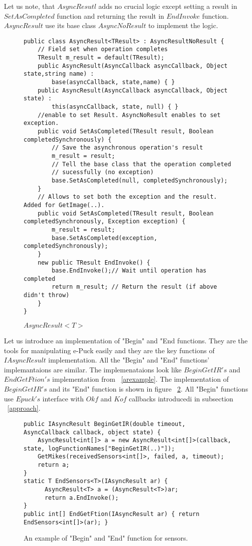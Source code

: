 	Let us note, that $AsyncResutl$ adds no crucial logic except setting a result in $SetAsCompleted$ function and
	returning the result in $EndInvoke$ function. $AsyncResult$ use its base class $AsyncNoResult$ to implement the logic.
\begin{figure}[!hbp]
\begin{lstlisting}
public class AsyncResult<TResult> : AsyncResultNoResult {
	// Field set when operation completes
	TResult m_result = default(TResult);
	public AsyncResult(AsyncCallback asyncCallback, Object state,string name) : 
		base(asyncCallback, state,name) { }
	public AsyncResult(AsyncCallback asyncCallback, Object state) : 
		this(asyncCallback, state, null) { }
	//enable to set Result. AsyncNoResult enables to set exception.
	public void SetAsCompleted(TResult result, Boolean completedSynchronously) {
		// Save the asynchronous operation's result
		m_result = result;
		// Tell the base class that the operation completed 
		// sucessfully (no exception)
		base.SetAsCompleted(null, completedSynchronously);
	}
	// Allows to set both the exception and the result. Added for GetImage(..).
	public void SetAsCompleted(TResult result, Boolean completedSynchronously, Exception exception) {
		m_result = result;
		base.SetAsCompleted(exception, completedSynchronously);
	}
	new public TResult EndInvoke() {
		base.EndInvoke();// Wait until operation has completed 
		return m_result; // Return the result (if above didn't throw)
	}
}
\end{lstlisting}

\caption{$AsyncResult<T>$} \label{result}
\end{figure}

	Let us introduce an implementation of "Begin" and "End functions.
	They are the tools for manipulating e-Puck easily and they are the key functions of $IAsyncResult$ implementation.
	All the "Begin" and "End" functions' implemantaions are similar. The implemenataions look like $BeginGetIR's$ and $EndGetFtion's$ implementation from ~\ref{arexample}.
	The implementation of $BeginGetIR's$ and its "End" function is shown in figure ~\ref{beginsens}.
	All "Begin" functions use $Epuck's$ interface with $Okf$ and $Kof$ callbacks introducedi
	in subsection ~\ref{approach}.	

\begin{figure}[!hbp]
\begin{lstlisting}
public IAsyncResult BeginGetIR(double timeout, AsyncCallback callback, object state) {
	AsyncResult<int[]> a = new AsyncResult<int[]>(callback, state, logFunctionNames["BeginGetIR(..)"]);
	GetMikes(receivedSensors<int[]>, failed, a, timeout);
	return a;
}
static T EndSensors<T>(IAsyncResult ar) {
      AsyncResult<T> a = (AsyncResult<T>)ar;
      return a.EndInvoke();
}
public int[] EndGetFtion(IAsyncResult ar) { return EndSensors<int[]>(ar); }
\end{lstlisting}	
\caption{An example of "Begin" and "End" function for sensors.} \label{beginsens}
\end{figure}

